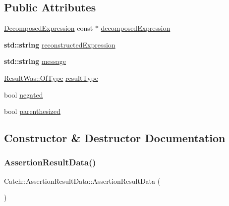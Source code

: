 \subsection*{Public Attributes}
\begin{DoxyCompactItemize}
\item 
\hyperlink{struct_catch_1_1_decomposed_expression}{Decomposed\+Expression} const  $\ast$ \hyperlink{struct_catch_1_1_assertion_result_data_a45b2bf2ed11da83d09dd78a2b7a44cd4}{decomposed\+Expression}
\item 
\textbf{ std\+::string} \hyperlink{struct_catch_1_1_assertion_result_data_a9e809d36fffbeb1c7d0cbe7382dd9595}{reconstructed\+Expression}
\item 
\textbf{ std\+::string} \hyperlink{struct_catch_1_1_assertion_result_data_ac34215803c4c4a88f795879f61c1f7b4}{message}
\item 
\hyperlink{struct_catch_1_1_result_was_a624e1ee3661fcf6094ceef1f654601ef}{Result\+Was\+::\+Of\+Type} \hyperlink{struct_catch_1_1_assertion_result_data_a7ceab4a7ff722aec5587e3748caf66b7}{result\+Type}
\item 
bool \hyperlink{struct_catch_1_1_assertion_result_data_a17773c6f999cfded12e470b0321694a1}{negated}
\item 
bool \hyperlink{struct_catch_1_1_assertion_result_data_a8418e3744b5486cb7f0d79c84569078e}{parenthesized}
\end{DoxyCompactItemize}


\subsection{Constructor \& Destructor Documentation}
\mbox{\label{struct_catch_1_1_assertion_result_data_a37179edde9f853f22d4456677fd97701}} 
\subsubsection{\texorpdfstring{Assertion\+Result\+Data()}{AssertionResultData()}}
{\footnotesize\ttfamily Catch\+::\+Assertion\+Result\+Data\+::\+Assertion\+Result\+Data (\begin{DoxyParamCaption}{ }\end{DoxyParamCaption})\hspace{0.3cm}{\ttfamily [inline]}}



